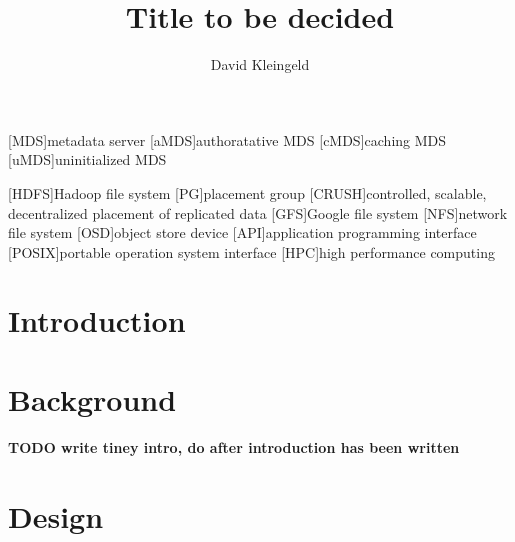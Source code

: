 \documentclass[lang=en, hanging-titles=true]{skrapport}
\title{Title to be decided}
\author{David Kleingeld}
\begin{document}
\begin{titlepage}
\maketitle
\end{titlepage}
\tableofcontents
\clearpage

\newcommand{\zookeeper}{ZooKeeper}
\newcommand{\raft}{Raft}
\newcommand{\paxos}{Paxos}
\newcommand{\multipaxos}{Multi-Paxos}
\newcommand{\ceph}{Ceph}
\newcommand{\zab}{Zab}

\newcommand{\name}{my system}
\newcommand{\Name}{My system}

\newcommand{\textacro}[1]{\small{#1}}
\begin{acronym}
	[\textacro{MDS}]{metadata server}
	[\textacro{aMDS}]{authoratative MDS}
	[\textacro{cMDS}]{caching MDS}
	[\textacro{uMDS}]{uninitialized MDS}

	[\textacro{HDFS}]{Hadoop file system}
	[\textacro{PG}]{placement group}
	[\textacro{CRUSH}]{controlled, scalable, decentralized placement of replicated data}
	[\textacro{GFS}]{Google file system}
	[\textacro{NFS}]{network file system}
	[\textacro{OSD}]{object store device}
	[\textacro{API}]{application programming interface}
	[\textacro{POSIX}]{portable operation system interface}
	[\textacro{HPC}]{high performance computing}
\end{acronym}

\section{Introduction} \label{sec:intro}
 

\section{Background}
\textbf{TODO write tiney intro, do after introduction has been written}






\acresetall{}
\section{Design}


\clearpage
\appendix
\printbibliography
\end{document}
